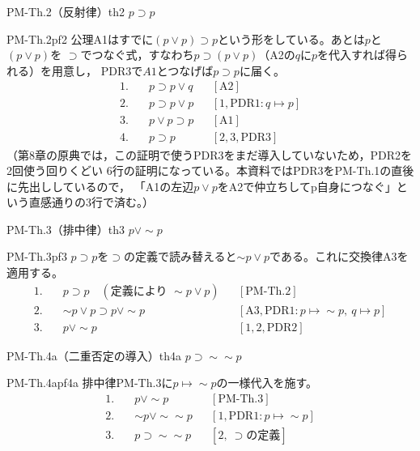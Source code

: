 \documentclass[autodetect-engine,dvi=dvipdfmx,ja=standard]{bxjsarticle}
\begin{document}
\begin{theorem}{PM-Th.2（反射律）}{th2}
\(p\supset p\)
\end{theorem}
\begin{tproof}{PM-Th.2}{pf2}
公理A1はすでに\((p\lor p)\supset p\)という形をしている。あとは\(p\)と\((p\lor p)\)を
\(\supset\)でつなぐ式，すなわち\(p\supset(p\lor p)\)（A2の\(q\)に\(p\)を代入すれば得られる）を用意し，
PDR3で\(A1\)とつなげば\(p\supset p\)に届く。
\begin{align*}
  1.\quad & p\supset p\lor q && [\mathrm{A2}]\\
  2.\quad & p\supset p\lor p && [1,\mathrm{PDR1}: q\mapsto p]\\
  3.\quad & p\lor p\supset p && [\mathrm{A1}]\\
  4.\quad & p\supset p && [2,3,\mathrm{PDR3}]
\end{align*}
（第8章の原典では，この証明で使うPDR3をまだ導入していないため，PDR2を2回使う回りくどい
6行の証明になっている。本資料ではPDR3をPM-Th.1の直後に先出ししているので，
「A1の左辺\(p\lor p\)をA2で仲立ちしてp自身につなぐ」という直感通りの3行で済む。）
\end{tproof}

\begin{theorem}{PM-Th.3（排中律）}{th3}
\(p\lor\sim p\)
\end{theorem}
\begin{tproof}{PM-Th.3}{pf3}
\(p\supset p\)を\(\supset\)の定義で読み替えると\(\sim p\lor p\)である。これに交換律A3を適用する。
\begin{align*}
  1.\quad & p\supset p\quad(\text{定義により }\sim p\lor p) && [\mathrm{PM\text{-}Th.2}]\\
  2.\quad & \sim p\lor p\supset p\lor\sim p && [\mathrm{A3},\mathrm{PDR1}: p\mapsto\sim p,\ q\mapsto p]\\
  3.\quad & p\lor\sim p && [1,2,\mathrm{PDR2}]
\end{align*}
\end{tproof}

\begin{theorem}{PM-Th.4a（二重否定の導入）}{th4a}
\(p\supset\sim\sim p\)
\end{theorem}
\begin{tproof}{PM-Th.4a}{pf4a}
排中律PM-Th.3に\(p\mapsto\sim p\)の一様代入を施す。
\begin{align*}
  1.\quad & p\lor\sim p && [\mathrm{PM\text{-}Th.3}]\\
  2.\quad & \sim p\lor\sim\sim p && [1,\mathrm{PDR1}: p\mapsto\sim p]\\
  3.\quad & p\supset\sim\sim p && [2,\ \supset\text{の定義}]
\end{align*}
\end{tproof}
\end{document}
